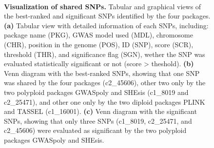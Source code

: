 \documentclass{article}
\begin{document}
\begin{figure}[H]
\begin{minipage}[t]{1\columnwidth}
~

{\fboxrule 0.2pt\fboxsep 2pt}%
\end{minipage}
\begin{centering}
\par\end{centering}
\caption{\scriptsize \textbf{Visualization of shared SNPs.} Tabular and graphical views of the best-ranked and significant SNPs identified by the four packages. \textbf{(a)} Tabular view with detailed information of each SNPs, including: package name (PKG), GWAS model used (MDL), chromosome (CHR), position in the genome (POS), ID (SNP), score (SCR), threshold (THR), and significance flag (SGN), wether the SNP was evaluated statistically significant or not (score > theshold). \textbf{(b)} Venn diagram with the best-ranked SNPs, showing that one SNP was shared by the four packages (c2\_45606), other two only by the two polyploid packages GWASpoly and SHEsis (c1\_8019 and c2\_25471), and other one only by the two diploid packages PLINK and TASSEL (c1\_16001). \textbf{(c)} Venn diagram with the significant SNPs, showing that only three SNPs (c1\_8019, c2\_25471, and c2\_45606) were evaluated as significant by the two polyploid packages GWASpoly and SHEsis.\label{fig:-View-Shared-SNPs}}
\end{figure}
\end{document}
